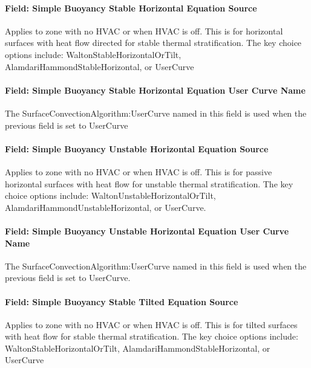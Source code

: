 \paragraph{Field: Simple Buoyancy Stable Horizontal Equation Source}\label{field-simple-buoyancy-stable-horizontal-equation-source}

Applies to zone with no HVAC or when HVAC is off. This is for horizontal surfaces with heat flow directed for stable thermal stratification. The key choice options include: WaltonStableHorizontalOrTilt, AlamdariHammondStableHorizontal, or UserCurve

\paragraph{Field: Simple Buoyancy Stable Horizontal Equation User Curve Name}\label{field-simple-buoyancy-stable-horizontal-equation-user-curve-name}

The SurfaceConvectionAlgorithm:UserCurve named in this field is used when the previous field is set to UserCurve

\paragraph{Field: Simple Buoyancy Unstable Horizontal Equation Source}\label{field-simple-buoyancy-unstable-horizontal-equation-source}

Applies to zone with no HVAC or when HVAC is off. This is for passive horizontal surfaces with heat flow for unstable thermal stratification. The key choice options include: WaltonUnstableHorizontalOrTilt, AlamdariHammondUnstableHorizontal, or UserCurve.

\paragraph{Field: Simple Buoyancy Unstable Horizontal Equation User Curve Name}\label{field-simple-buoyancy-unstable-horizontal-equation-user-curve-name}

The SurfaceConvectionAlgorithm:UserCurve named in this field is used when the previous field is set to UserCurve.

\paragraph{Field: Simple Buoyancy Stable Tilted Equation Source}\label{field-simple-buoyancy-stable-tilted-equation-source}

Applies to zone with no HVAC or when HVAC is off. This is for tilted surfaces with heat flow for stable thermal stratification. The key choice options include: WaltonStableHorizontalOrTilt, AlamdariHammondStableHorizontal, or UserCurve

